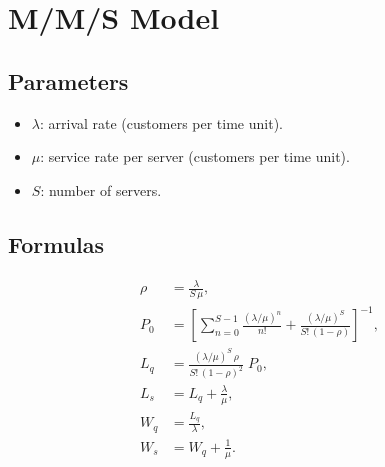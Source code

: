 \documentclass[12pt,a4paper]{article}
\begin{document}
\section{M/M/S Model}
\subsection*{Parameters}
\begin{itemize}
  \item \(\lambda\): arrival rate (customers per time unit).
  \item \(\mu\): service rate per server (customers per time unit).
  \item \(S\): number of servers.
\end{itemize}

\subsection*{Formulas}
\begin{align*}
\rho    &= \frac{\lambda}{S\,\mu},\\
P_{0}   &= \left[\sum_{n=0}^{S-1}\frac{(\lambda/\mu)^n}{n!}
          + \frac{(\lambda/\mu)^S}{S!\,(1-\rho)}\right]^{-1},\\
L_{q}   &= \frac{(\lambda/\mu)^S\,\rho}{S!\,(1-\rho)^2}\;P_{0},\\
L_{s}   &= L_{q} + \frac{\lambda}{\mu},\\
W_{q}   &= \frac{L_{q}}{\lambda},\\
W_{s}   &= W_{q} + \frac{1}{\mu}.
\end{align*}
\end{document}
